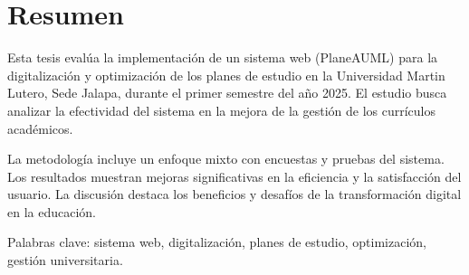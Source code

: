 \section*{\centering Resumen}

Esta tesis evalúa la implementación de un sistema web (PlaneAUML) para la digitalización y optimización de los planes de estudio en la Universidad Martin Lutero, Sede Jalapa, durante el primer semestre del año 2025. El estudio busca analizar la efectividad del sistema en la mejora de la gestión de los currículos académicos.

La metodología incluye un enfoque mixto con encuestas y pruebas del sistema. Los resultados muestran mejoras significativas en la eficiencia y la satisfacción del usuario. La discusión destaca los beneficios y desafíos de la transformación digital en la educación.

Palabras clave: sistema web, digitalización, planes de estudio, optimización, gestión universitaria.